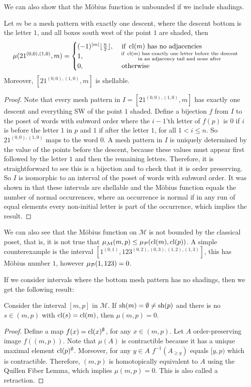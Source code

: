 \documentclass[11pt,a4paper,oneside]{article}
\begin{document}
We can also show that the M\"obius function is unbounded if we include shadings.
\begin{lem}\label{lem:mobUn}
Let $m$ be a mesh pattern with exactly one descent, where the descent bottom is
the letter $1$, and all boxes south west of the point $1$ are shaded, then
$$
\mu(21^{(0,0),(1,0)},m)=\begin{cases}
(-1)^{|m|}\lfloor\frac{n}{2}\rfloor,&\mbox{ if } \operatorname{\textrm{cl}}(m) \mbox{ has no adjacencies}\\
1,&\substack{ \text{ if } \operatorname{\textrm{cl}}(m) \text{ has exactly one letter before the descent} \\\text{ in an adjacency tail and none after}}\\
0, &\mbox{ otherwise}
\end{cases}
$$
Moreover, $[21^{(0,0),(1,0)},m]$ is shellable.
\begin{proof}
Note that every mesh pattern in $I=[21^{(0,0),(1,0)},m]$ has exactly one descent
and everything SW of the point $1$ shaded. Define a bijection $f$ from $I$ to
the poset of words with subword order where the $i-1$'th letter of $f(p)$ is $0$
if $i$ is before the letter $1$ in $p$ and $1$ if after the letter $1$, for all
$1<i\le n$. So $21^{(0,0),(1,0)}$ maps to the word $0$. A mesh pattern in $I$ is
uniquely determined by the value of the points before the descent, because these
values must appear first followed by the letter $1$ and then the remaining
letters. Therefore, it is straightforward to see this is a bijection and to
check that it is order preserving. So $I$ is isomorphic to an interval of the
poset of words with subword order. It was shown in \cite{Bjo90} that these
intervals are shellable and the M\"obius function equals the number of normal
occurrences, where an occurrence is normal if in any run of equal elements every
non-initial letter is part of the occurrence, which implies the result.
\end{proof}
\end{lem}

We can also see that the M\"obius function on $\mathcal{M}$ is not bounded by
the classical poset, that is, it is not true that $\operatorname{\mu_\mathcal{M}}(m,p)\le
\operatorname{\mu_\mathcal{P}}(\operatorname{\textrm{cl}}(m),\operatorname{\textrm{cl}}(p))$. A simple counterexample is the interval
$[1^{(0,1)},123^{(0,2),(0,3),(1,2),(1,3)}]$, this has M\"obius number $1$,
however $\operatorname{\mu_\mathcal{P}}(1,123)=0$.

If we consider intervals where the bottom mesh pattern has no shadings, then we
get the following result:
\begin{lem}\label{lem:mu0}
Consider the interval $[m,p]$ in $\mathcal{M}$. If $\operatorname{\textrm{sh}}(m)=\emptyset\not=\operatorname{\textrm{sh}}(p)$
and there is no $s\in(m,p)$ with $\operatorname{\textrm{cl}}(s)=\operatorname{\textrm{cl}}(m)$, then $\mu(m,p)=0$.
\begin{proof}
Define a map $f(x)=\operatorname{\textrm{cl}}(x)^\emptyset$, for any $x\in(m,p)$. Let $A$
order-preserving image $f((m,p))$. Note that $\mu(A)$ is contractible because it has a unique maximal element $\operatorname{\textrm{cl}}(p)^\emptyset$. Moreover, for any $y\in A$ $f^{-1}(A_{\ge y})$ equals $[y,p)$ which is contractible. Therefore, $(m,p)$ is homotopically equivalent to $A$ using the Quillen Fiber Lemma, which implies $\mu(m,p)=0$. This is also called a retraction.
\end{proof}
\end{lem}
\end{document}
